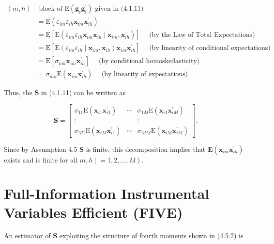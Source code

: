 \documentclass[10pt]{article}
\begin{document}
\begin{align*}
(m, h) & \text { block of } \mathrm{E}\left(\mathbf{g}_{i} \mathbf{g}_{i}^{\prime}\right) \text { given in (4.1.11) } \\
& =\mathrm{E}\left(\varepsilon_{i m} \varepsilon_{i h} \mathbf{x}_{i m} \mathbf{x}_{i h}^{\prime}\right) \\
& =\mathrm{E}\left[\mathrm{E}\left(\varepsilon_{i m} \varepsilon_{i h} \mathbf{x}_{i m} \mathbf{x}_{i h}^{\prime} \mid \mathbf{x}_{i m}, \mathbf{x}_{i h}\right)\right] \quad \text { (by the Law of Total Expectations) } \\
& =\mathrm{E}\left[\mathrm{E}\left(\varepsilon_{i m} \varepsilon_{i h} \mid \mathbf{x}_{i m}, \mathbf{x}_{i h}\right) \mathbf{x}_{i m} \mathbf{x}_{i h}^{\prime}\right] \quad \text { (by linearity of conditional expectations) } \\
& =\mathrm{E}\left[\sigma_{m h} \mathbf{x}_{i m} \mathbf{x}_{i h}^{\prime}\right] \quad \text { (by conditional homoskedasticity) } \\
& =\sigma_{m h} \mathrm{E}\left(\mathbf{x}_{i m} \mathbf{x}_{i h}^{\prime}\right) \quad \text { (by linearity of expectations) } \tag{4.5.1}
\end{align*}


Thus, the $\mathbf{S}$ in (4.1.11) can be written as

\[
\mathbf{S}=\left[\begin{array}{ccc}
\sigma_{11} \mathrm{E}\left(\mathbf{x}_{i 1} \mathbf{x}_{i 1}^{\prime}\right) & \cdots & \sigma_{1 M} \mathrm{E}\left(\mathbf{x}_{i 1} \mathbf{x}_{i M}^{\prime}\right)  \tag{4.5.2}\\
\vdots & & \vdots \\
\sigma_{M 1} \mathrm{E}\left(\mathbf{x}_{i M} \mathbf{x}_{i 1}^{\prime}\right) & \cdots & \sigma_{M M} \mathrm{E}\left(\mathbf{x}_{i M} \mathbf{x}_{i M}^{\prime}\right)
\end{array}\right] .
\]

Since by Assumption 4.5 $\mathbf{S}$ is finite, this decomposition implies that $\mathbf{E}\left(\mathbf{x}_{i m} \mathbf{x}_{i h}^{\prime}\right)$ exists and is finite for all $m, h(=1,2, \ldots, M)$.

\section*{Full-Information Instrumental Variables Efficient (FIVE)}
An estimator of $\mathbf{S}$ exploiting the structure of fourth moments shown in (4.5.2) is
\end{document}
